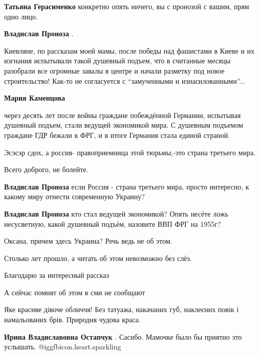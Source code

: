 \begin{itemize}
\begin{itemize}
\begin{itemize}
\textbf{Татьяна Герасименко} конкретно опять ничего, вы с пронозой с вашим, прям одно лицо.
\end{itemize} %

\textbf{Владислав Проноза} . 

Киевляне, по рассказам моей мамы, после победы над фашистами в Киеве и их
изгнания испытывали такой душевный подъем, что в считанные месяцы разобрали все
огромные завалы в центре и начали разметку под новое строительство! Как-то не
согласуется с \enquote{замученными и изнасилованными}...

\begin{itemize} %
\textbf{Мария Каменцова} 

через десять лет после войны граждане побеждённой Германии, испытывая душевный
подъем, стали ведущей экономикой мира. С душевным подъемом граждане ГДР бежали в
ФРГ, и в итоге Германия стала единой страной.

Эсэсэр сдох, а россия- правоприемница этой тюрьмы,-это страна третьего мира.

Всего доброго, не болейте.

\textbf{Владислав Проноза} если Россия - страна третьего мира, просто интересно, к какому миру отнести современную Украину?

\textbf{Владислав Проноза} кто стал ведущей экономикой? Опять несёте ложь несусветную, какой душевный подъём, назовите ВВП ФРГ на 1955г?

Оксана, причем здесь Украина? Речь ведь не об этом.
\end{itemize} %


\end{itemize} %

Столько лет прошло, а читать об этом невозможно без слёз.

Благодарю за интересный рассказ

А сейчас помнят об этом в сми не сообщают


Яке красиве дівоче обличчя! Без татуажа, накачаних губ, наклеєних повік і
намальованих брів. Природня чудова краса.

\begin{itemize} %
\textbf{Ирина Владиславовна Остапчук} . Сасибо. Мамочке было бы приятно это услышать.  @igg{fbicon.heart.sparkling} 
\end{itemize} %


\end{itemize}
